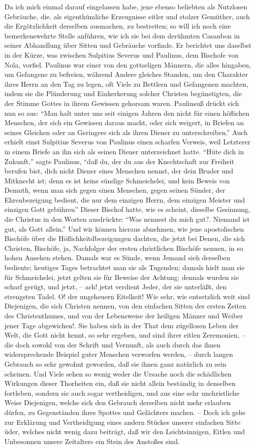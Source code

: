 Da ich mich einmal darauf eingelassen habe, jene ebenso beliebten als Nutzlosen Gebräuche, die. als eigenthümliche Erzeugnisse eitler und stolzer Gemüther, auch die Ergötzlichkeit derselben ausmachen, zu bestreiten; so will ich noch eine bemerkenswehrte Stelle anführen, wie ich sie bei dem derühmten Casanbon in seiner Abhandlung über Sitten und Gebräuche vorfinde. Er berichtet uns daselbst in der Kürze, was zwischen Sulpitius Severus und Paulinus, dem Bischofe von Nola, vorfiel. Paulinus war einer von den gottseligen Männern, die alles hingaben, um Gefangene zu befreien, während Andere gleiches Standen, um den Charakter ihres Herrn an den Tag zu legen, oft Viele zu Bettlern und Gefangenen machten, indem sie die Plünderung und Einkerkerung solcher Christen begünstigten, die der Stimme Gottes in ihrem Gewissen gehorsam waren. Paulinsuß drückt sich nun so aus: "`Man halt unter uns seit einigen Jahren den nicht für einen höflichen Menschen, der sich ein Gewissen daraus macht, oder sich weigert, in Briefen an seines Gleichen oder an Geringere sich als ihren Diener zu unterschreiben."' Auch erhielt einst Sulpitius Severus von Paulinus einen scharfen Verweis, weil Letzterer in einem Briefe an ihn sich als seinen Diener unterzeichnet hatte. "`Hüte dich in Zukunft,"' sagte Paulinus, "`daß du, der du aus der Knechtschaft zur Freiheit berufen bist, dich nicht Diener eines Menschen nennst, der dein Bruder und Mitknecht ist; denn es ist keine sündige Schmeichelei, und kein Beweis von Demuth, wenn man sich gegen einen Menschen, gegen seinen Sünder, der Ehrenbezeigung bedient, die nur dem einzigen Herrn, dem einzigen Meister und einzigen Gott gebühren"' Dieser Bischof hatte, wie es scheint, dieselbe Gesinnung, die Christus in den Worten ausdrückte: "`Was nennest du mich gut?. Niemand ist gut, als Gott allein."' Und wir können hieraus abnehmen, wie jene apostolischen Bischöfe über die Höflichkeitdbezeigungen dachten, die jetzt bei Denen, die sich Christen, Bischöfe, ja, Nachfolger der ersten christlichen Bischöfe nennen, in so hohen Ansehen stehen. Damals war es Sünde, wenn Jemand sieh derselben bediente; heutiges Tages betrachtet man sie als Tugenden; damals hielt man sie für Schmeichelei, jetzt gelten sie für Beweise der Achtung; dennals wurden sie scharf gerügt, und jetzt, -- ach! jetzt verdient Jeder, der sie unterläßt, den strengsten Tadel. O! der ungeheuern Eitelkeit! Wie sehr, wie entsetzlich weit sind Diejenigen, die sich Christen nennen, von den einfachen Sitten der ersten Zeiten des Christenthumes, und von der Lebensweise der heiligen Männer und Weiber jener Tage abgewichen!. Sie haben sich in der That dem zügellosen Leben der Welt, die Gott nicht kennt, so sehr ergeben, und sind ihrer eitlen Zeremonien, -- die doch sowohl von der Schrift und Vernunft, als auch durch das ihnen widersprechende Beispiel guter Menschen verworfen werden, -- durch langen Gebrauch so sehr gewohnt geworden, daß sie ihnen ganz natürlich zu sein scheinen. Und Viele sehen so wenig weder die Ursache noch die schädlichen Wirkungen dieser Thorheiten ein, daß sie nicht allein beständig in denselben fortleben, sondern sie auch sogar vertheidigen, und aus eine sehr unchristliche Weise Diejenigen, welche sich den Gebrauch derselben nicht mehr erlauben dürfen, zu Gegenständen ihres Spottes und Gelächters machen. -- Doch ich gehe zur Erklärung und Vertheidigung eines andern Stückes unserer einfachen Sitte üder, welches nicht wenig dazu beiträgt, daß wir den Leichtsinnigen, Eitlen und Unbesonnen unsere Zeitalters ein Stein des Anstoßes sind.

